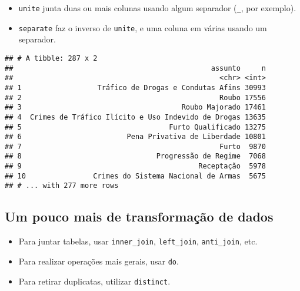 \documentclass[]{book}
\newenvironment{Shaded}{\begin{snugshade}}{\end{snugshade}}
\newcommand{\KeywordTok}[1]{\textcolor[rgb]{0.13,0.29,0.53}{\textbf{{#1}}}}
\newcommand{\DataTypeTok}[1]{\textcolor[rgb]{0.13,0.29,0.53}{{#1}}}
\newcommand{\StringTok}[1]{\textcolor[rgb]{0.31,0.60,0.02}{{#1}}}
\newcommand{\OtherTok}[1]{\textcolor[rgb]{0.56,0.35,0.01}{{#1}}}
\newcommand{\NormalTok}[1]{{#1}}
\providecommand{\tightlist}{%
  \setlength{\itemsep}{0pt}\setlength{\parskip}{0pt}}
\begin{document}
\begin{itemize}
\tightlist
\item
  \texttt{unite} junta duas ou mais colunas usando algum separador
  (\texttt{\_}, por exemplo).
\item
  \texttt{separate} faz o inverso de \texttt{unite}, e uma coluna em
  várias usando um separador.
\end{itemize}

\begin{Shaded}
\end{Shaded}

\begin{verbatim}
## # A tibble: 287 x 2
##                                               assunto     n
##                                                 <chr> <int>
## 1                  Tráfico de Drogas e Condutas Afins 30993
## 2                                               Roubo 17556
## 3                                      Roubo Majorado 17461
## 4  Crimes de Tráfico Ilícito e Uso Indevido de Drogas 13635
## 5                                   Furto Qualificado 13275
## 6                         Pena Privativa de Liberdade 10801
## 7                                               Furto  9870
## 8                                Progressão de Regime  7068
## 9                                          Receptação  5978
## 10                Crimes do Sistema Nacional de Armas  5675
## # ... with 277 more rows
\end{verbatim}

\subsection{Um pouco mais de transformação de
dados}\label{um-pouco-mais-de-transformacao-de-dados}

\begin{itemize}
\tightlist
\item
  Para juntar tabelas, usar \texttt{inner\_join}, \texttt{left\_join},
  \texttt{anti\_join}, etc.
\item
  Para realizar operações mais gerais, usar \texttt{do}.
\item
  Para retirar duplicatas, utilizar \texttt{distinct}.
\end{itemize}
\end{document}
